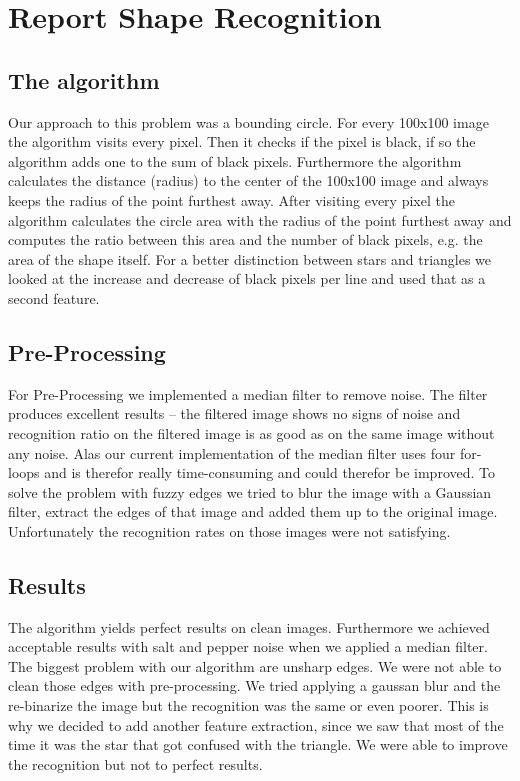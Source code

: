 \documentclass[a4paper, 10pt]{article}
\begin{document}
	\section{Report Shape Recognition}
	
	\subsection{The algorithm}
	
	\par{Our approach to this problem was a bounding circle. For every 100x100 image the algorithm visits every pixel. Then it checks if the pixel is black, if so the algorithm adds one to the sum of black pixels. Furthermore the algorithm calculates the distance (radius) to the center of the 100x100 image and always keeps the radius of the point furthest away. After visiting every pixel the algorithm calculates the circle area with the radius of the point furthest away and computes the ratio between this area and the number of black pixels, e.g. the area of the shape itself. For a better distinction between stars and triangles we looked at the increase and decrease of black pixels per line and used that as a second feature.}
	
	\subsection{Pre-Processing}
	
	\par{For Pre-Processing we implemented a median filter to remove noise. The filter produces excellent results – the filtered image shows no signs of noise and recognition ratio on the filtered image is as good as on the same image without any noise. Alas our current implementation of the median filter uses four for-loops and is therefor really time-consuming and could therefor be improved. To solve the problem with fuzzy edges we tried to blur the image with a Gaussian filter, extract the edges of that image and added them up to the original image. Unfortunately the recognition rates on those images were not satisfying.}
	
	\subsection{Results}
	
	\par{The algorithm yields perfect results on clean images. Furthermore we achieved acceptable results with salt and pepper noise when we applied a median filter. The biggest problem with our algorithm are unsharp edges. We were not able to clean those edges with pre-processing. We tried applying a gaussan blur and the re-binarize the image but the recognition was the same or even poorer. This is why we decided to add another feature extraction, since we saw that most of the time it was the star that got confused with the triangle. We were able to improve the recognition but not to perfect results.}
	
\end{document}
